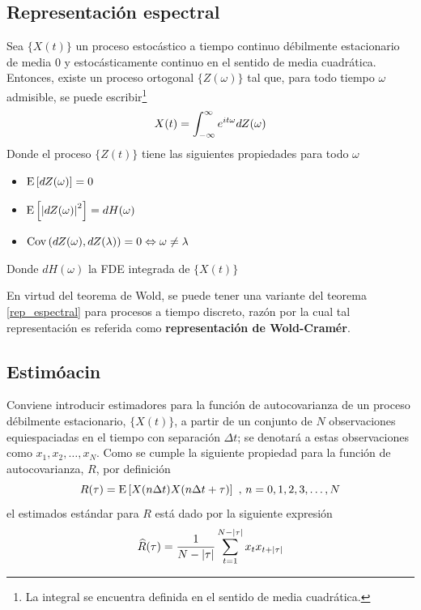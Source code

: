 \subsection{Representación espectral}

\begin{teorema}
Sea $\{X(t)\}$ un proceso estoc\'astico a tiempo continuo d\'ebilmente estacionario de media 0 y 
estoc\'asticamente continuo en el sentido de media cuadr\'atica. Entonces, existe un proceso 
ortogonal $\{Z(\omega)\}$ tal que, para todo tiempo $\omega$ admisible, se puede 
escribir\footnote{La integral se encuentra definida en el sentido de media cuadr\'atica.}
\begin{equation*}
X(t) = \int_{-\infty}^{\infty} e^{i t \omega} dZ(\omega)
\end{equation*}
Donde el proceso $\{Z(t)\}$ tiene las siguientes propiedades para todo $\omega$
\begin{itemize}
\item $\mathrm{E}\left[ dZ(\omega) \right] = 0$
\item $\mathrm{E}\left[ \left| dZ(\omega) \right|^{2} \right] = dH(\omega)$
\item $\mathrm{Cov}\left( dZ(\omega),dZ(\lambda) \right) = 0 \Leftrightarrow \omega \neq \lambda$
\end{itemize}
Donde $dH(\omega)$ la FDE integrada de $\{X(t)\}$
\label{rep_espectral}
\end{teorema}

En virtud del teorema de Wold, se puede tener una variante del teorema \ref{rep_espectral}
para procesos a tiempo discreto, raz\'on por la cual  
tal representaci\'on es referida como \textbf{representaci\'on de Wold-Cram\'er}.


\subsection{Estimóacin}

Conviene introducir estimadores para la funci\'on de autocovarianza de un proceso d\'ebilmente 
estacionario, $\{ X(t) \}$, a partir de un conjunto de $N$ observaciones equiespaciadas en el 
tiempo con separaci\'on $\Delta t$; se denotar\'a a estas observaciones como 
$x_1, x_2 , \dots, x_N$. Como se cumple la siguiente propiedad para la funci\'on de autocovarianza, 
$R$, por definici\'on
\begin{equation*}
R(\tau) = \mathrm{E}\left[ X(n\Delta t)X(n\Delta t + \tau) \right] \text{  ,  } n = 0, 1, 2,  3,\dots, N
\end{equation*}
el estimados est\'andar para $R$ est\'a dado por la siguiente expresi\'on
\begin{equation*}
\widehat{R}(\tau) = \frac{1}{N-\left| \tau \right|} 
\sum_{t = 1}^{N-\left| \tau \right|} x_t x_{t+\left| \tau \right|}
\label{estimador_R}
\end{equation*}

